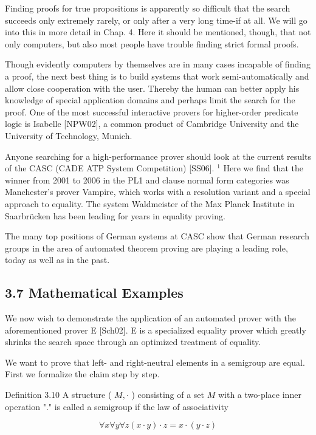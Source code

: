 \documentclass[10pt]{book}
\begin{document}
Finding proofs for true propositions is apparently so difficult that the search succeeds only extremely rarely, or only after a very long time-if at all. We will go into this in more detail in Chap. 4. Here it should be mentioned, though, that not only computers, but also most people have trouble finding strict formal proofs.

Though evidently computers by themselves are in many cases incapable of finding a proof, the next best thing is to build systems that work semi-automatically and allow close cooperation with the user. Thereby the human can better apply his knowledge of special application domains and perhaps limit the search for the proof. One of the most successful interactive provers for higher-order predicate logic is Isabelle [NPW02], a common product of Cambridge University and the University of Technology, Munich.

Anyone searching for a high-performance prover should look at the current results of the CASC (CADE ATP System Competition) [SS06]. ${ }^{1}$ Here we find that the winner from 2001 to 2006 in the PL1 and clause normal form categories was Manchester's prover Vampire, which works with a resolution variant and a special approach to equality. The system Waldmeister of the Max Planck Institute in Saarbrücken has been leading for years in equality proving.

The many top positions of German systems at CASC show that German research groups in the area of automated theorem proving are playing a leading role, today as well as in the past.

\subsection*{3.7 Mathematical Examples}
We now wish to demonstrate the application of an automated prover with the aforementioned prover E [Sch02]. E is a specialized equality prover which greatly shrinks the search space through an optimized treatment of equality.

We want to prove that left- and right-neutral elements in a semigroup are equal. First we formalize the claim step by step.

Definition 3.10 A structure ( $M, \cdot$ ) consisting of a set $M$ with a two-place inner operation "." is called a semigroup if the law of associativity

$$
\forall x \forall y \forall z(x \cdot y) \cdot z=x \cdot(y \cdot z)
$$
\end{document}
